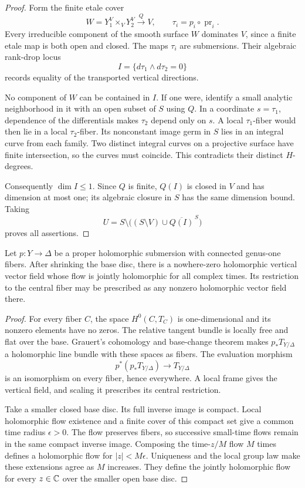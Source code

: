 \begin{proof}
Form the finite etale cover
\[
W=Y_1^V\times_VY_2^V\xrightarrow{\,Q\,}V,\qquad
\tau_i=p_i\circ\operatorname{pr}_i.
\]
Every irreducible component of the smooth surface $W$
dominates $V$, since a finite etale map is both open and closed.
The maps $\tau_i$ are submersions. Their algebraic rank-drop
locus
\[
I=\{d\tau_1\wedge d\tau_2=0\}
\]
records equality of the transported vertical directions.

No component of $W$ can be contained in $I$. If one were,
identify a small analytic neighborhood in it with an open
subset of $S$ using $Q$. In a coordinate $s=\tau_1$,
dependence of the differentials makes $\tau_2$ depend only on
$s$. A local $\tau_1$-fiber would then lie in a local
$\tau_2$-fiber. Its nonconstant image germ in $S$ lies in an
integral curve from each family. Two distinct integral curves
on a projective surface have finite intersection, so the
curves must coincide. This contradicts their distinct
$H$-degrees.

Consequently $\dim I\le1$. Since $Q$ is finite, $Q(I)$ is
closed in $V$ and has dimension at most one; its algebraic
closure in $S$ has the same dimension bound. Taking
\[
U=S\setminus\bigl((S\setminus V)\cup\overline{Q(I)}^{\,S}\bigr)
\]
proves all assertions.
\end{proof}

\begin{lemma}\label{prj:flow}
Let $p:Y\to\Delta$ be a proper holomorphic submersion with
connected genus-one fibers. After shrinking the base disc,
there is a nowhere-zero holomorphic vertical vector field
whose flow is jointly holomorphic for all complex times.
Its restriction to the central fiber may be prescribed as
any nonzero holomorphic vector field there.
\end{lemma}

\begin{proof}
For every fiber $C$, the space $H^0(C,T_C)$ is one-dimensional
and its nonzero elements have no zeros. The relative tangent
bundle is locally free and flat over the base. Grauert's
cohomology and base-change theorem \cite[\S~7, Satz~5]{Grauert} makes
$p_*T_{Y/\Delta}$ a holomorphic line bundle with these spaces
as fibers. The evaluation morphism
\[
p^*(p_*T_{Y/\Delta})\longrightarrow T_{Y/\Delta}
\]
is an isomorphism on every fiber, hence everywhere.
A local frame gives the vertical field, and scaling it
prescribes its central restriction.

Take a smaller closed base disc. Its full inverse image is
compact. Local holomorphic flow existence and a finite cover
of this compact set give a common time radius $\epsilon>0$.
The flow preserves fibers, so successive small-time flows
remain in the same compact inverse image. Composing the
time-$z/M$ flow $M$ times defines a holomorphic flow for
$|z|<M\epsilon$. Uniqueness and the local group law make
these extensions agree as $M$ increases. They define the
jointly holomorphic flow for every $z\in\mathbb C$ over the smaller
open base disc.
\end{proof}

